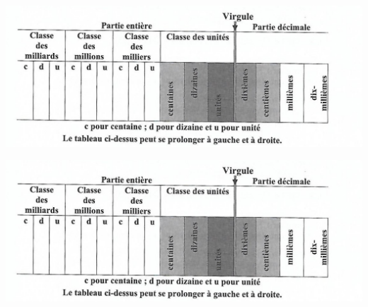 \documentclass[12pt,a4paper]{article}
\begin{document}
\vspace*{0.25cm}

\begin{center}
	\includegraphics[scale=1]{img/tab}
\end{center}

\vspace*{0.25cm}

\begin{center}
	\includegraphics[scale=1]{img/tab}
\end{center}



	
\end{document}
